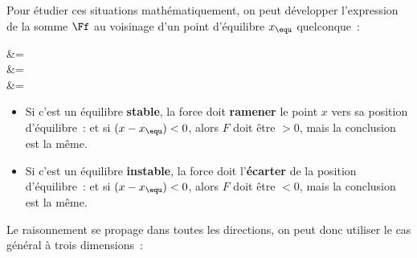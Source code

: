\documentclass[../../main/main.tex]{subfiles}
\begin{document}
Pour étudier ces situations mathématiquement, on peut développer l'expression de
la somme $\Ff$ au voisinage d'un point d'équilibre $x_{\equ}$ quelconque~:
\begin{DispWithArrows*}
	 &= 
	\\\Lra
	 &=
	\\\Lra
	 &= 
\end{DispWithArrows*}

\begin{itemize}
	\item Si c'est un équilibre \textbf{stable}, la force doit \textbf{ramener}
	      le point $x$ vers sa position d'équilibre~:
	      et si $(x-x_{\equ}) < 0$, alors $F$ doit être $>0$, mais la conclusion
	      est la même.
	\item Si c'est un équilibre \textbf{instable}, la force doit
	      l'\textbf{écarter} de la position d'équilibre~:
	      et si $(x-x_{\equ}) < 0$, alors $F$ doit être $<0$, mais la conclusion
	      est la même.
\end{itemize}

Le raisonnement se propage dans toutes les directions, on peut donc utiliser le
cas général à trois dimensions~:
\end{document}
